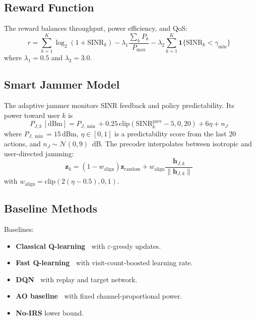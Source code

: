 \documentclass[journal,twocolumn]{IEEEtran}
\newcommand{\vect}[1]{\mathbf{#1}}
\begin{document}
\subsection{Reward Function}

The reward balances throughput, power efficiency, and QoS:
\begin{equation}
r = \sum_{k=1}^{K}\log_2(1 + \text{SINR}_k) - \lambda_1\frac{\sum_k P_k}{P_{\max}} - \lambda_2\sum_{k=1}^{K}\mathbf{1}\{\text{SINR}_k < \gamma_{\min}\}
\label{eq:reward}
\end{equation}
where $\lambda_1=0.5$ and $\lambda_2=3.0$.

\subsection{Smart Jammer Model}

The adaptive jammer monitors SINR feedback and policy predictability. Its power toward user $k$ is
\begin{equation}
P_{J,k}\,[\text{dBm}] = P_{J,\min} + 0.25\,\text{clip}(\text{SINR}_k^{\text{prev}} - 5, 0, 20) + 6\eta + n_J
\label{eq:jammer_power}
\end{equation}
where $P_{J,\min}=15\,\text{dBm}$, $\eta \in [0,1]$ is a predictability score from the last 20 actions, and $n_J \sim \mathcal{N}(0,9)$~dB. The precoder interpolates between isotropic and user-directed jamming:
\begin{equation}
\vect{z}_k = (1 - w_{\text{align}})\vect{z}_{\text{random}} + w_{\text{align}}\frac{\vect{h}_{J,k}}{\|\vect{h}_{J,k}\|}
\end{equation}
with $w_{\text{align}} = \text{clip}(2(\eta - 0.5), 0, 1)$.

\subsection{Baseline Methods}

Baselines:
\begin{itemize}
\item \textbf{Classical Q-learning~\cite{watkins1992q}} with $\varepsilon$-greedy updates.
\item \textbf{Fast Q-learning~\cite{yang2021irs}} with visit-count-boosted learning rate.
\item \textbf{DQN~\cite{mnih2015human}} with replay and target network.
\item \textbf{AO baseline~\cite{wu2019intelligent}} with fixed channel-proportional power.
\item \textbf{No-IRS} lower bound.
\end{itemize}
\end{document}
